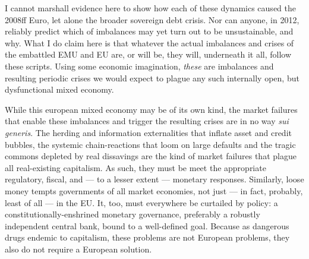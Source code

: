 \documentclass[11pt,a4paper,oneside,openright]{article}
\begin{document}
I cannot marshall evidence here to show how each of these dynamics caused the 2008ff Euro, let alone the broader sovereign debt crisis. 
Nor can anyone, in 2012, reliably predict which of imbalances may yet turn out to be unsustainable, and why. 
What I do claim here is that whatever the actual imbalances and crises of the embattled \gls{EMU} and \gls{EU} are, or will be, they will, underneath it all, follow these scripts. 
Using some economic imagination, \emph{these} are imbalances and resulting periodic crises we would expect to plague any such internally open, but dysfunctional mixed economy.

While this european mixed economy may be of its own kind, the market failures that enable these imbalances and trigger the resulting crises are in no way \emph{sui generis}. 
The herding and information externalities that inflate asset and credit bubbles, the systemic chain-reactions that loom on large defaults and the tragic commons depleted by real dissavings are the kind of market failures that plague all real-existing capitalism. 
As such, they must be meet the appropriate regulatory, fiscal, and --- to a lesser extent --- monetary responses. 
Similarly, loose money tempts governments of all market economies, not just --- in fact, probably, least of all --- in the \gls{EU}. 
It, too, must everywhere be curtailed by policy: 
a constitutionally-enshrined monetary governance, preferably a robustly independent central bank, bound to a well-defined goal. 
Because as dangerous drugs endemic to capitalism, these problems are not European problems, they also do not require a European solution. 
\end{document}
